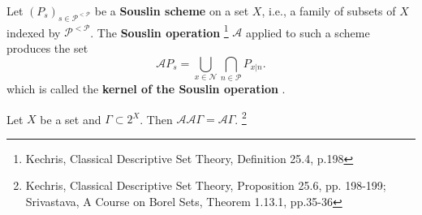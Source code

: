 \begin{definition}
Let $(P_s)_{s\in\mathcal{P}^{<\mathcal{P}}}$ be a \textbf{Souslin scheme}
on a set $X$, i.e., a family of subsets of $X$ indexed by
$\mathcal{P}^{<\mathcal{P}}$. The \textbf{Souslin operation}
\footnote{Kechris, Classical Descriptive Set Theory, Definition 25.4, p.198}
$\mathcal{A}$ applied to such a scheme produces the set
\[
  \mathcal{A} P_s 
    = \bigcup_{x\in\mathcal{N}} \bigcap_{n\in\mathcal{P}} P_{x|n}.
\]
which is called the \textbf{kernel of the Souslin operation}
.
\end{definition}


\begin{proposition} \label{P:souslin_idem}
Let $X$ be a set and $\Gamma\subset 2^X$. Then 
$\mathcal{A}\mathcal{A}\Gamma=\mathcal{A}\Gamma$.
  \footnote{Kechris, Classical Descriptive Set Theory, Proposition 25.6, 
    pp. 198-199; Srivastava, A Course on Borel Sets, Theorem 1.13.1, pp.35-36}
\end{proposition}
